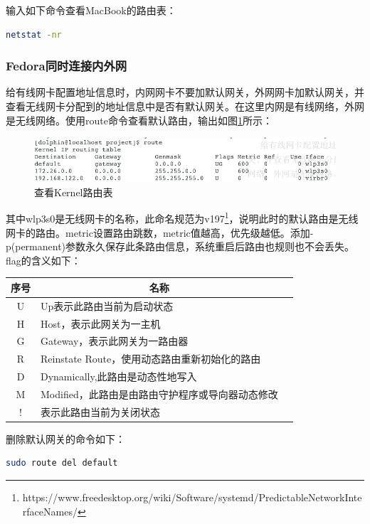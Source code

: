 \documentclass[letter]{book}
\begin{document}
输入如下命令查看MacBook的路由表：

\begin{lstlisting}[language=Bash]
netstat -nr
\end{lstlisting}

\subsubsection{Fedora同时连接内外网}

给有线网卡配置地址信息时，内网网卡不要加默认网关，外网网卡加默认网关，并查看无线网卡分配到的地址信息中是否有默认网关。在这里内网是有线网络，外网是无线网络。使用route命令查看默认路由，输出如图\ref{fig:routetable}所示：

\begin{figure}[htbp]
	\centering
	\includegraphics[scale=0.4]{route-table.jpg}
	\caption{查看Kernel路由表}
	\label{fig:routetable}
\end{figure}

其中wlp3s0是无线网卡的名称，此命名规范为v197\footnote{https://www.freedesktop.org/wiki/Software/systemd/PredictableNetworkInterfaceNames/}，说明此时的默认路由是无线网卡的路由。metric设置路由跳数，metric值越高，优先级越低。添加-p(permanent)参数永久保存此条路由信息，系统重启后路由也规则也不会丢失。flag的含义如下：

\begin{tabular}{cp{10cm}c}
	\hline
	\multirow{1}{*}{序号}
	& \multicolumn{1}{c}{名称}  \\
	\hline			
	U  & Up表示此路由当前为启动状态 \\	
	H & Host，表示此网关为一主机 \\
	G & Gateway，表示此网关为一路由器\\
	R & Reinstate Route，使用动态路由重新初始化的路由\\
	D & Dynamically,此路由是动态性地写入\\
	M & Modified，此路由是由路由守护程序或导向器动态修改\\
	! & 表示此路由当前为关闭状态\\
	\hline
\end{tabular}

删除默认网关的命令如下：

\begin{lstlisting}[language=Bash]
sudo route del default
\end{lstlisting}
\end{document}
